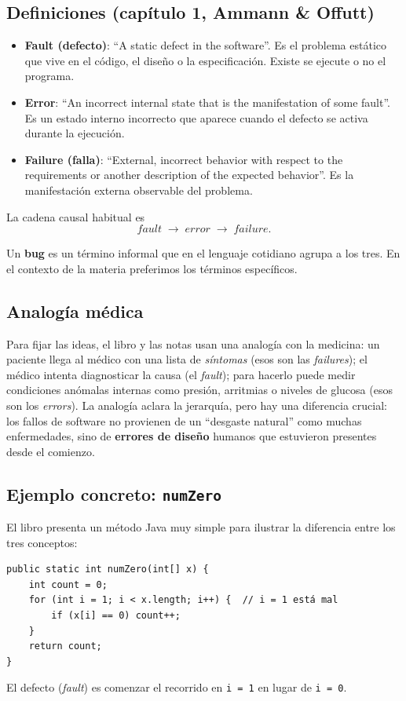 \documentclass[12pt,a4paper]{article}
\begin{document}
\subsection{Definiciones (capítulo 1, Ammann \& Offutt)}
\begin{itemize}
  \item \textbf{Fault (defecto)}: ``A static defect in the software''. Es el problema estático que vive en el código, el diseño o la especificación. Existe se ejecute o no el programa.
  \item \textbf{Error}: ``An incorrect internal state that is the manifestation of some fault''. Es un estado interno incorrecto que aparece cuando el defecto se activa durante la ejecución.
  \item \textbf{Failure (falla)}: ``External, incorrect behavior with respect to the requirements or another description of the expected behavior''. Es la manifestación externa observable del problema.
\end{itemize}

La cadena causal habitual es
\[
\textit{fault} \;\longrightarrow\; \textit{error} \;\longrightarrow\; \textit{failure}.
\]

Un \textbf{bug} es un término informal que en el lenguaje cotidiano agrupa a los tres. En el contexto de la materia preferimos los términos específicos.

\subsection{Analogía médica}
Para fijar las ideas, el libro y las notas usan una analogía con la medicina: un paciente llega al médico con una lista de \textit{síntomas} (esos son las \textit{failures}); el médico intenta diagnosticar la causa (el \textit{fault}); para hacerlo puede medir condiciones anómalas internas como presión, arritmias o niveles de glucosa (esos son los \textit{errors}). La analogía aclara la jerarquía, pero hay una diferencia crucial: los fallos de software no provienen de un ``desgaste natural'' como muchas enfermedades, sino de \textbf{errores de diseño} humanos que estuvieron presentes desde el comienzo.

\subsection{Ejemplo concreto: \texttt{numZero}}
El libro presenta un método Java muy simple para ilustrar la diferencia entre los tres conceptos:
\begin{lstlisting}[style=javastyle]
public static int numZero(int[] x) {
    int count = 0;
    for (int i = 1; i < x.length; i++) {  // i = 1 está mal
        if (x[i] == 0) count++;
    }
    return count;
}
\end{lstlisting}
El defecto (\textit{fault}) es comenzar el recorrido en \texttt{i = 1} en lugar de \texttt{i = 0}.
\end{document}
